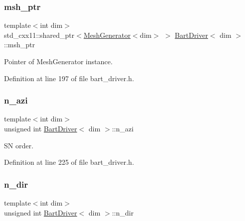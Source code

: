 \subsubsection{\texorpdfstring{msh\+\_\+ptr}{msh\_ptr}}
{\footnotesize\ttfamily template$<$int dim$>$ \\
std\+\_\+cxx11\+::shared\+\_\+ptr$<$\hyperlink{class_mesh_generator}{Mesh\+Generator}$<$dim$>$ $>$ \hyperlink{class_bart_driver}{Bart\+Driver}$<$ dim $>$\+::msh\+\_\+ptr\hspace{0.3cm}{\ttfamily [private]}}



Pointer of Mesh\+Generator instance. 



Definition at line 197 of file bart\+\_\+driver.\+h.

\mbox{\label{class_bart_driver_a3726013dac04d13b87e35cb0c3b8b557}} 
\subsubsection{\texorpdfstring{n\+\_\+azi}{n\_azi}}
{\footnotesize\ttfamily template$<$int dim$>$ \\
unsigned int \hyperlink{class_bart_driver}{Bart\+Driver}$<$ dim $>$\+::n\+\_\+azi\hspace{0.3cm}{\ttfamily [private]}}



SN order. 



Definition at line 225 of file bart\+\_\+driver.\+h.

\mbox{\label{class_bart_driver_aa1694538581e7941bbda0960bd3c7e39}} 
\subsubsection{\texorpdfstring{n\+\_\+dir}{n\_dir}}
{\footnotesize\ttfamily template$<$int dim$>$ \\
unsigned int \hyperlink{class_bart_driver}{Bart\+Driver}$<$ dim $>$\+::n\+\_\+dir\hspace{0.3cm}{\ttfamily [private]}}



